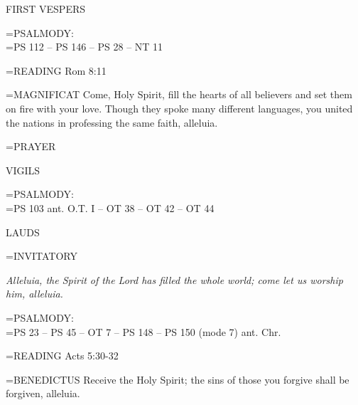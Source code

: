 \begin{flushleft}\normalsize FIRST VESPERS\\\end{flushleft}

\hangindent=\parindent \small{PSALMODY:}\\
\hangindent=\parindent  PS 112 -- PS 146 -- PS 28 -- NT 11\vspace{0.5em}

\hangindent=\parindent \small{READING}	Rom 8:11 \textbf{\\}

\hangindent=\parindent \small{MAGNIFICAT 	Come, Holy Spirit, fill the hearts of all believers and set them on fire with your love. Though they spoke many different languages, you united the nations in professing the same faith, alleluia.\\}

\hangindent=\parindent \small{PRAYER 	}

\begin{flushleft}\normalsize VIGILS\\\end{flushleft}

\hangindent=\parindent \small{PSALMODY:}\\
\hangindent=\parindent  PS 103 ant. O.T. I -- OT 38 -- OT 42 -- OT 44\vspace{0.5em}

\begin{flushleft}\normalsize LAUDS\\\end{flushleft}

\hangindent=\parindent \small{INVITATORY}
\begin{center}
\textit{Alleluia, the Spirit of the Lord has filled the whole world; come let us worship him, alleluia.\\}
\end{center}

\hangindent=\parindent \small{PSALMODY:}\\
\hangindent=\parindent  PS 23 -- PS 45 -- OT 7 -- PS 148 -- PS 150 (mode 7) ant. Chr.\vspace{0.5em}

\hangindent=\parindent \small{READING}	Acts 5:30-32 \textbf{\\}

\hangindent=\parindent \small{BENEDICTUS 	Receive the Holy Spirit; the sins of those you forgive shall be forgiven, alleluia.\\}

